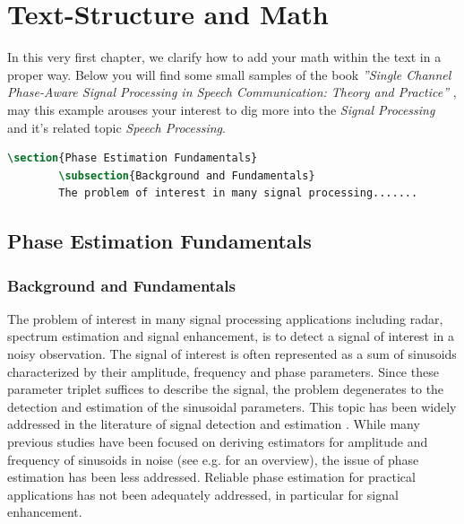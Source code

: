 \chapter{Text-Structure and Math}\label{ch:TSandMath}
In this very first chapter, we clarify how to add your math within the text in a proper way. Below you will find some small samples of the book \emph{''Single Channel Phase-Aware Signal Processing in Speech Communication: Theory and Practice''} \cite{MowlaeePejman2016}, may this example arouses your interest to dig more into the \emph{Signal Processing} and it's related topic \emph{Speech Processing}.

\begin{mdframed}
	\begin{lstlisting}[language = TeX, caption={Adding section and subsection}, linewidth = 150mm]
		\section{Phase Estimation Fundamentals}
		\subsection{Background and Fundamentals}
		The problem of interest in many signal processing.......	
	\end{lstlisting}
\end{mdframed}

\section{Phase Estimation Fundamentals}\label{sec:PEF}
\subsection{Background and Fundamentals}
The problem of interest in many signal processing applications including radar, spectrum estimation and signal enhancement, is to detect a signal of interest in a noisy observation. The signal of interest is often represented as a sum of sinusoids characterized by their amplitude, frequency and phase parameters. Since these parameter triplet suffices to describe the signal, the problem degenerates to the detection and estimation of the sinusoidal parameters. This topic has been widely addressed in the literature of signal detection \cite{VanTrees1968} and estimation \cite{Kay1993}. While many previous studies have been focused on deriving estimators for amplitude and frequency of sinusoids in noise (see e.g. \cite{Stoica2005} for an overview), the issue of phase estimation has been less addressed. Reliable phase estimation for practical applications has not been adequately addressed, in particular for signal enhancement.

